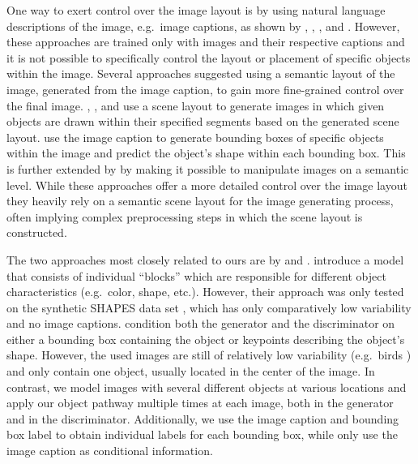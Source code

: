 \documentclass{article} \usepackage{iclr2019_conference,times}
\begin{document}
	One way to exert control over the image layout is by using natural language descriptions of the image, e.g.\ image captions, as shown by
	\cite{reed2016generative}, \cite{zhang2017stackgan++}, \cite{sharma2018chatpainter}, and \cite{xu2017attngan}.
	However, these approaches are trained only with images and their respective captions and it is not possible to specifically control the layout or placement of specific objects within the image.
	Several approaches suggested using a semantic layout of the image, generated from the image caption, to gain more fine-grained control over the final image.
	\cite{karacan2016learning}, \cite{johnson2018image}, and \cite{wang2018high} use a scene layout to generate images in which given objects are drawn within their specified segments based on the generated scene layout.
	\cite{hong2018inferring} use the image caption to generate bounding boxes of specific objects within the image and predict the object's shape within each bounding box.
	This is further extended by \cite{hong2018learning} by making it possible to manipulate images on a semantic level.
	While these approaches offer a more detailed control over the image layout they heavily rely on a semantic scene layout for the image generating process, often implying complex preprocessing steps in which the scene layout is constructed.
	
	The two approaches most closely related to ours are by \cite{reed2016learning} and \cite{rajcompositional}.
	\cite{rajcompositional} introduce a model that consists of individual ``blocks'' which are responsible for different object characteristics (e.g.\ color, shape, etc.).
	However, their approach was only tested on the synthetic SHAPES data set \citep{andreas2016neural}, which has only comparatively low variability and no image captions.
	\cite{reed2016generative} condition both the generator and the discriminator on either a bounding box containing the object or keypoints describing the object's shape.
	However, the used images are still of relatively low variability (e.g.\ birds \citep{wah2011caltech}) and only contain one object, usually located in the center of the image.
	In contrast, we model images with several different objects at various locations and apply our object pathway multiple times at each image, both in the generator and in the discriminator.
	Additionally, we use the image caption and bounding box label to obtain individual labels for each bounding box, while \cite{reed2016generative} only use the image caption as conditional information.	
	
\end{document}
